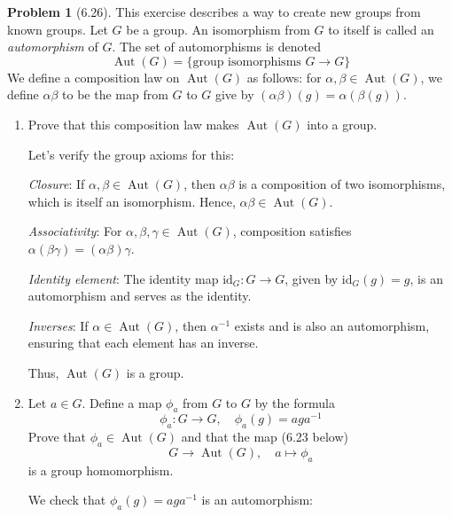 \documentclass[12pt]{article}
\theoremstyle{definition}
\newtheorem{problem}{Problem}
\DeclareMathOperator{\Aut}{Aut}
\begin{document}
\begin{problem}[6.26]
    This exercise describes a way to create new groups from known groups. Let $G$ be a group. An isomorphism from $G$ to itself
    is called an \textit{automorphism} of $G$. The set of automorphisms is denoted
    \[
        \Aut(G) = \{ \text{group isomorphisms } G \longrightarrow G \}
    \]
    We define a composition law on $\Aut(G)$ as follows: for $\alpha, \beta \in \Aut(G)$, we define $\alpha\beta$ to be the map
    from $G$ to $G$ give by $(\alpha\beta)(g) = \alpha(\beta(g))$.
    \begin{enumerate}[label=(\alph*)]
        \item Prove that this composition law makes $\Aut(G)$ into a group.
        
        \begin{solution}
            Let's verify the group axioms for this:
            
            \textit{Closure}: If $\alpha, \beta \in \Aut(G)$, then $\alpha\beta$ is a composition of two isomorphisms, which is itself an isomorphism. Hence, $\alpha\beta \in \Aut(G)$.

            \textit{Associativity}: For $\alpha, \beta, \gamma \in \Aut(G)$, composition satisfies $\alpha(\beta\gamma) = (\alpha\beta)\gamma$.

            \textit{Identity element}: The identity map $\text{id}_G : G \to G$, given by $\text{id}_G(g) = g$, is an automorphism and serves as the identity.

            \textit{Inverses}: If $\alpha \in \Aut(G)$, then $\alpha^{-1}$ exists and is also an automorphism, ensuring that each element has an inverse.
            
            Thus, $\Aut(G)$ is a group.

        \end{solution}

        \item Let $a \in G$. Define a map $\phi_a$ from $G$ to $G$ by the formula
              \[
                  \phi_a : G \longrightarrow G, \quad \phi_a(g) = aga^{-1}
              \]
              Prove that $\phi_a \in \Aut(G)$ and that the map (6.23 below)
              \[
                  G \longrightarrow \Aut(G), \quad a \longmapsto \phi_a
              \]
              is a group homomorphism.

        \begin{solution}
            We check that $\phi_a(g) = aga^{-1}$ is an automorphism:
            

\end{solution}
\end{enumerate}
\end{problem}
\end{document}
